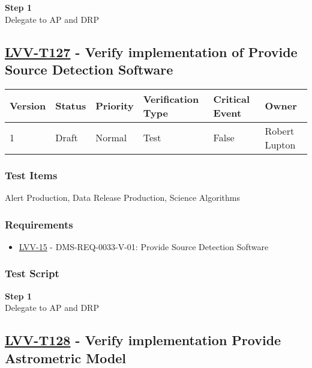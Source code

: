 \textbf{Step 1}\\
Delegate to AP and DRP\\[2\baselineskip]

\hypertarget{lvv-t127---verify-implementation-of-provide-source-detection-software}{\subsection{\texorpdfstring{\href{https://jira.lsstcorp.org/secure/Tests.jspa\#/testCase/LVV-T127}{LVV-T127}
- Verify implementation of Provide Source Detection
Software}{LVV-T127 - Verify implementation of Provide Source Detection Software}}\label{lvv-t127---verify-implementation-of-provide-source-detection-software}}

\begin{longtable}[]{@{}llllll@{}}
\toprule
Version & Status & Priority & Verification Type & Critical Event &
Owner\tabularnewline
\midrule
\endhead
1 & Draft & Normal & Test & False & Robert Lupton\tabularnewline
\bottomrule
\end{longtable}

\subsubsection{Test Items}\label{test-items-5}

Alert Production, Data Release Production, Science Algorithms~

\subsubsection{Requirements}\label{requirements-5}

\begin{itemize}
\tightlist
\item
  \href{https://jira.lsstcorp.org/browse/LVV-15}{LVV-15} -
  DMS-REQ-0033-V-01: Provide Source Detection Software
\end{itemize}

\subsubsection{Test Script}\label{test-script-5}

\textbf{Step 1}\\
Delegate to AP and DRP\\[2\baselineskip]

\hypertarget{lvv-t128---verify-implementation-provide-astrometric-model}{\subsection{\texorpdfstring{\href{https://jira.lsstcorp.org/secure/Tests.jspa\#/testCase/LVV-T128}{LVV-T128}
- Verify implementation Provide Astrometric
Model}{LVV-T128 - Verify implementation Provide Astrometric Model}}\label{lvv-t128---verify-implementation-provide-astrometric-model}}

